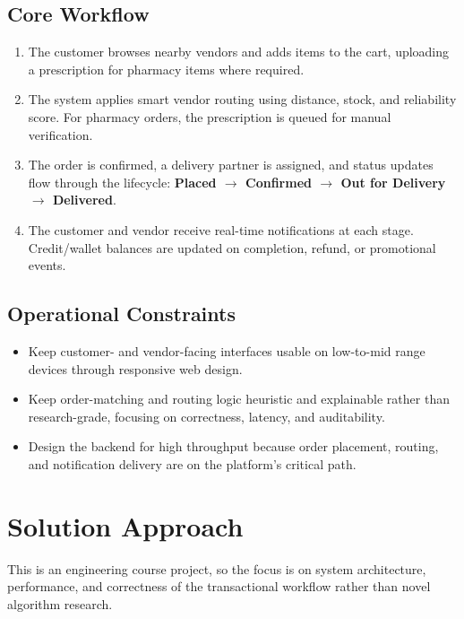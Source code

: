 \documentclass[11pt,a4paper]{article}
\begin{document}
\subsection{Core Workflow}

\begin{enumerate}[leftmargin=1.8em]
    \item The customer browses nearby vendors and adds items to the cart, uploading a prescription
    for pharmacy items where required.
    \item The system applies smart vendor routing using distance, stock, and reliability score.
    For pharmacy orders, the prescription is queued for manual verification.
    \item The order is confirmed, a delivery partner is assigned, and status updates flow through
    the lifecycle: \textbf{Placed $\rightarrow$ Confirmed $\rightarrow$ Out for Delivery $\rightarrow$ Delivered}.
    \item The customer and vendor receive real-time notifications at each stage. Credit/wallet
    balances are updated on completion, refund, or promotional events.
\end{enumerate}

\subsection{Operational Constraints}

\begin{itemize}[leftmargin=1.5em]
    \item Keep customer- and vendor-facing interfaces usable on low-to-mid range devices through
    responsive web design.
    \item Keep order-matching and routing logic heuristic and explainable rather than research-grade,
    focusing on correctness, latency, and auditability.
    \item Design the backend for high throughput because order placement, routing, and notification
    delivery are on the platform's critical path.
\end{itemize}

\section{Solution Approach}

This is an engineering course project, so the focus is on system architecture, performance,
and correctness of the transactional workflow rather than novel algorithm research.
\end{document}
